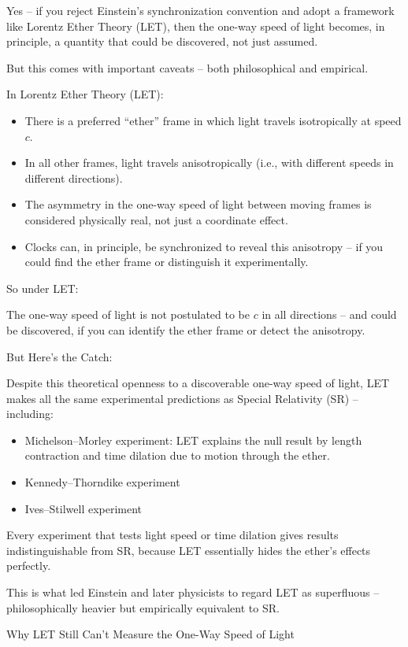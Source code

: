 \documentclass[a4paper]{article}
\theoremstyle{plain}
\theoremstyle{definition}
\begin{document}
Yes -- if you reject Einstein's synchronization convention and adopt a
framework like Lorentz Ether Theory (LET), then the one-way speed of
light becomes, in principle, a quantity that could be discovered, not
just assumed.

But this comes with important caveats -- both philosophical and
empirical.

In Lorentz Ether Theory (LET):
\begin{itemize}
\item There is a preferred ``ether'' frame in which light travels
  isotropically at speed $c$.
\item In all other frames, light travels anisotropically (i.e., with
  different speeds in different directions).
\item The asymmetry in the one-way speed of light between moving
  frames is considered physically real, not just a coordinate effect.
\item Clocks can, in principle, be synchronized to reveal this
  anisotropy -- if you could find the ether frame or distinguish it
  experimentally.
\end{itemize}
So under LET:

The one-way speed of light is not postulated to be $c$ in all
directions -- and could be discovered, if you can identify the ether
frame or detect the anisotropy.

But Here’s the Catch:

Despite this theoretical openness to a discoverable one-way speed of
light, LET makes all the same experimental predictions as Special
Relativity (SR) -- including:
\begin{itemize}
\item Michelson–Morley experiment: LET explains the null result by
  length contraction and time dilation due to motion through the
  ether.
\item Kennedy–Thorndike experiment
\item Ives–Stilwell experiment
\end{itemize}

Every experiment that tests light speed or time dilation gives results
indistinguishable from SR, because LET essentially hides the ether’s
effects perfectly.

This is what led Einstein and later physicists to regard LET as
superfluous -- philosophically heavier but empirically equivalent to
SR.

Why LET Still Can’t Measure the One-Way Speed of Light
\end{document}
